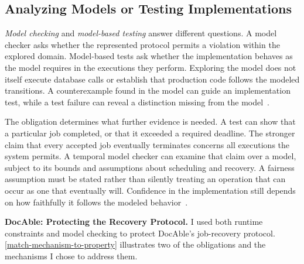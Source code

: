 \subsection{Analyzing Models or Testing Implementations}\label{heading:analyzing-models-or-testing-implementations}


\emph{Model checking} and \emph{model-based testing} answer different questions. A model checker asks whether the represented protocol permits a violation within the explored domain. Model-based tests ask whether the implementation behaves as the model requires in the executions they perform. Exploring the model does not itself execute database calls or establish that production code follows the modeled transitions. A counterexample found in the model can guide an implementation test, while a test failure can reveal a distinction missing from the model~\citep{baier-katoen2008,utting2012taxonomy}.


The obligation determines what further evidence is needed. A test can show that a particular job completed, or that it exceeded a required deadline. The stronger claim that every accepted job eventually terminates concerns all executions the system permits. A temporal model checker can examine that claim over a model, subject to its bounds and assumptions about scheduling and recovery. A fairness assumption must be stated rather than silently treating an operation that can occur as one that eventually will. Confidence in the implementation still depends on how faithfully it follows the modeled behavior~\citep{baier-katoen2008,lamport2002}.


\textbf{DocAble: Protecting the Recovery Protocol.} I used both runtime constraints and model checking to protect DocAble's job-recovery protocol. \autoref{match-mechanism-to-property} illustrates two of the obligations and the mechanisms I chose to address them.

